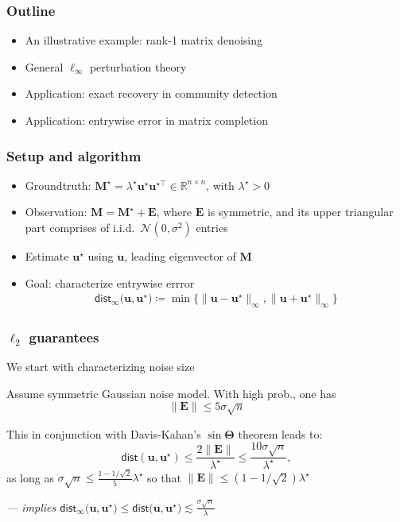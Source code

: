 \documentclass[compress,
mathserif,wide,%
]{beamer}
\begin{document}
\begin{frame}
\frametitle{Outline}

\begin{itemize}
  \itemsep1em
  \item An illustrative example: rank-1 matrix denoising
  \item General $\ell_{\infty}$ perturbation theory
  \item Application: exact recovery in community detection
  \item Application: entrywise error in matrix completion
\end{itemize}

\end{frame}





\begin{frame}
	\frametitle{Setup and algorithm}
	
	\begin{itemize}
		\itemsep 0.5em
		\item Groundtruth: $\bm{M}^{\star} = \lambda^{\star} \bm{u}^{\star} \bm{u}^{\star\top}\in \mathbb{R}^{n\times n}$, with $\lambda^\star > 0$
		\item Observation: $\bm{M} = \bm{M}^{\star} + \bm{E}$, where $\bm{E}$ is symmetric, and its upper triangular part comprises of i.i.d.~$\mathcal{N}(0, \sigma^2)$ entries
		\item Estimate $\bm{u}^{\star}$ using $\bm{u}$, leading eigenvector of $\bm{M}$
		\item Goal: characterize entrywise errror
		 \begin{align*}
	\mathsf{dist}_{\infty}\big(\bm{u},\bm{u}^{\star}\big)
	\coloneqq \min\big\{ \|\bm{u}-\bm{u}^{\star}\|_{\infty}, \|\bm{u}+\bm{u}^{\star}\|_{\infty} \big\}
\end{align*}
	\end{itemize}


\end{frame}


\begin{frame}
	\frametitle{$\ell_{2}$ guarantees}
	
	We start with characterizing noise size
	 
	\begin{lemma}
	Assume symmetric Gaussian noise model. With high prob., one has
	\[
	\|\bm{E}\| \leq 5 \sigma \sqrt{n}
	\] 
	\end{lemma}
	
	\vfill 
	This in conjunction with Davis-Kahan's $\sin \bm{\Theta}$ theorem leads to: 
	\[
	\mathsf{dist}(\bm{u}, \bm{u}^{\star}) \leq \frac{2\| \bm{E} \|}{ \lambda^\star } \leq \frac{10\sigma \sqrt{n} }{ \lambda^\star},
	\]
	as long as $\sigma \sqrt{n} \leq \frac{1 - 1/\sqrt{2} }{5} \lambda^\star$ so that $\|\bm{E}\| \leq (1 - 1 / \sqrt{2}) \lambda^\star$
	
	\vfill 
	{\hfill \em \footnotesize --- implies $\mathsf{dist}_{\infty}\big(\bm{u},\bm{u}^{\star}\big) \leq \mathsf{dist}\big(\bm{u},\bm{u}^{\star}\big) \lesssim \frac{\sigma \sqrt{n} }{ \lambda }$  }
\end{frame}
\end{document}
